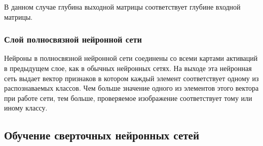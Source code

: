 \documentclass[14pt]{article}
\numberwithin{figure}{section}
\numberwithin{equation}{section}
\begin{document}
В данном случае глубина выходной матрицы соответствует глубине входной матрицы.

\subsubsection{Слой полносвязной нейронной сети}

Нейроны в полносвязной нейронной сети соединены со всеми картами активаций в предыдущем слое, как в обычных нейронных сетях. На выходе эта нейронная сеть выдает вектор признаков в котором каждый элемент соответствует одному из распознаваемых классов. Чем больше значение одного из элементов этого вектора при работе сети, тем больше, проверяемое изображение соответствует тому или иному классу.

\newpage

\subsection{Обучение сверточных нейронных сетей}
\end{document}
